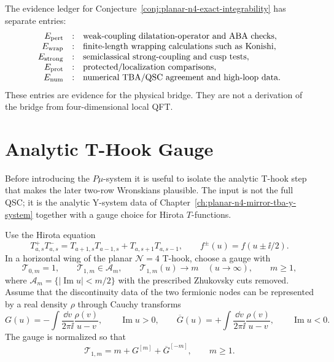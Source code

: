 The evidence ledger for Conjecture~\ref{conj:planar-n4-exact-integrability}
has separate entries:
\[
  \begin{array}{rcl}
    E_{\rm pert} &:& \hbox{weak-coupling dilatation-operator and ABA checks},\\
    E_{\rm wrap} &:& \hbox{finite-length wrapping calculations such as Konishi},\\
    E_{\rm strong} &:& \hbox{semiclassical strong-coupling and cusp tests},\\
    E_{\rm prot} &:& \hbox{protected/localization comparisons},\\
    E_{\rm num} &:& \hbox{numerical TBA/QSC agreement and high-loop data}.
  \end{array}
\]
These entries are evidence for the physical bridge.  They are not a derivation
of the bridge from four-dimensional local QFT.

\section{Analytic T-Hook Gauge}

Before introducing the \(P\mu\)-system it is useful to isolate the analytic
T-hook step that makes the later two-row Wronskians plausible.  The input is
not the full QSC; it is the analytic Y-system data of
Chapter~\ref{ch:planar-n4-mirror-tba-y-system} together with a gauge choice for
Hirota \(T\)-functions.

\begin{assumption}
\label{ass:qsc-one-row-t-gauge}
Use the Hirota equation
\[
  T_{a,s}^+T_{a,s}^-
  =
  T_{a+1,s}T_{a-1,s}+T_{a,s+1}T_{a,s-1},
  \qquad f^\pm(u)=f(u\pm\ii/2).
\]
In a horizontal wing of the planar \(\mathcal N=4\) T-hook, choose a gauge
with
\[
  \mathcal T_{0,m}=1,\qquad
  \mathcal T_{1,m}\in\mathcal A_m,\qquad
  \mathcal T_{1,m}(u)\to m\quad (u\to\infty),
  \qquad m\geq1,
\]
where \(\mathcal A_m=\{|\operatorname{Im}u|<m/2\}\) with the prescribed
Zhukovsky cuts removed.  Assume that the discontinuity data of the two
fermionic nodes can be represented by a real density \(\rho\) through Cauchy
transforms
\[
  G(u)=-\int\frac{\dd v}{2\pi\ii}\frac{\rho(v)}{u-v},
  \qquad \operatorname{Im}u>0,
  \qquad
  \overline G(u)=+\int\frac{\dd v}{2\pi\ii}\frac{\rho(v)}{u-v},
  \qquad \operatorname{Im}u<0.
\]
The gauge is normalized so that
\begin{equation}
  \mathcal T_{1,m}
  =
  m+G^{[m]}+\overline G^{[-m]},
  \qquad m\geq1.
  \label{eq:qsc-t-gauge-one-row}
\end{equation}
\end{assumption}

